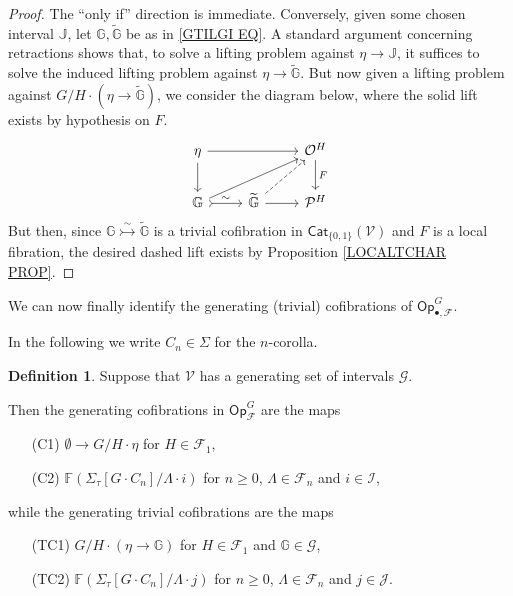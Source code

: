 \documentclass[a4paper,10pt
 ,final
]{article}%
\numberwithin{equation}{section}
\numberwithin{figure}{section}
\theoremstyle{definition} %
\newtheorem{definition}[equation]{Definition}%
\newcommand{\F}{\ensuremath{\mathcal F}}
\newcommand{\V}{\ensuremath{\mathcal V}}
\renewcommand{\O}{\ensuremath{\mathcal O}}
\renewcommand{\P}{\ensuremath{\mathcal P}}
\newcommand{\1}{\ensuremath{\mathbbm 1}}%
\begin{document}
\begin{proof}
        The ``only if'' direction is immediate.
        Conversely, given some chosen interval $\mathbb{J}$,
let $\mathbb{G}, \widetilde{\mathbb{G}}$
be as in \eqref{GTILGI EQ}.
A standard argument concerning retractions shows that,
to solve a lifting problem against $\eta \to \mathbb{J}$,
it suffices to solve the induced lifting problem against
$\eta \to \widetilde{\mathbb{G}}$.
But now given a lifting problem against 
$G/H \cdot \left(\eta \to \widetilde{\mathbb{G}}\right)$,
we consider the diagram below, where the solid lift exists by hypothesis on $F$.
\[
\begin{tikzcd}
	\eta \ar{d} \ar{rr}  
&&
	\O^H 	\ar{d}{F}
\\
	\mathbb{G} \ar[rightarrowtail]{r}{\sim} \ar{rru}
&
	\widetilde{\mathbb{G}} \ar{r} \ar[dashed]{ru}
&
	\P^H
\end{tikzcd}
\]
But then, since $\mathbb{G} \overset{\sim}{\rightarrowtail} \widetilde{\mathbb{G}}$
is a trivial cofibration in $\mathsf{Cat}_{\{0,1\}}(\V)$
and $F$ is a local fibration,
the desired dashed lift exists
by Proposition \ref{LOCALTCHAR PROP}.
\end{proof}


We can now finally identify the generating (trivial) cofibrations of
$\mathsf{Op}^G_{\bullet,\F}$.

In the following we write $C_n \in \Sigma$ for the $n$-corolla.


\begin{definition}\label{OPGENCOF DEF}
Suppose that $\V$ has a generating set of intervals $\mathscr{G}$.

Then the generating cofibrations in $\mathsf{Op}^G_{\F}$
are the maps
\begin{itemize}
\item[(C1)] $\emptyset \to G/H \cdot \eta$ for $H \in \F_1$,
\item[(C2)] $\mathbb{F} \left( \Sigma_{\tau}[G \cdot C_n]/\Lambda \cdot i\right)$
for $n \geq 0$, $\Lambda \in \F_n$ and $i \in \mathcal{I}$,
\end{itemize}
while the generating trivial cofibrations are the maps 
\begin{itemize}
\item[(TC1)] 
$G/H \cdot \left(\eta \to \mathbb{G}\right)$ for $H \in \F_1$ and $\mathbb{G} \in \mathscr{G}$,
\item[(TC2)] 
$\mathbb{F} \left( \Sigma_{\tau}[G \cdot C_n]/\Lambda \cdot j\right)$
for $n \geq 0$, $\Lambda \in \F_n$ and $j \in \mathcal{J}$.
\end{itemize}
\end{definition}
\end{document}
